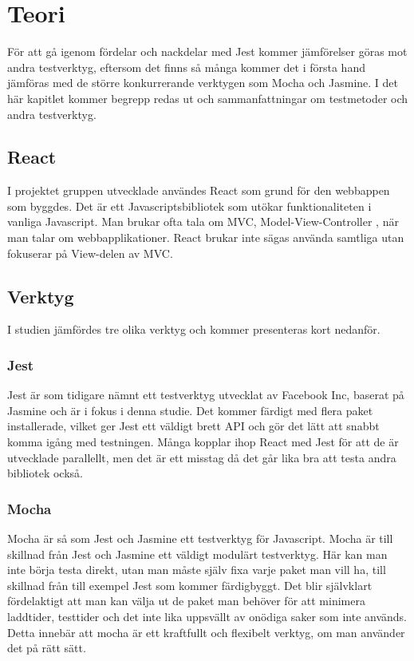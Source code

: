 \section{Teori}
\label{sec:david-theory}
För att gå igenom fördelar och nackdelar med Jest kommer jämförelser göras mot andra testverktyg, eftersom det finns så många kommer det i första hand jämföras med de större konkurrerande verktygen \cite{bib-test-tools} som Mocha och Jasmine. I det här kapitlet kommer begrepp redas ut och sammanfattningar om testmetoder och andra testverktyg.


\subsection{React}
I projektet gruppen utvecklade användes React som grund för den webbappen som byggdes. Det är ett Javascriptsbibliotek som utökar funktionaliteten i vanliga Javascript. Man brukar ofta tala om MVC, Model-View-Controller \cite{bib-mvc}, när man talar om webbapplikationer. React brukar inte sägas använda samtliga utan fokuserar på View-delen av MVC.

\subsection{Verktyg}
I studien jämfördes tre olika verktyg och kommer presenteras kort nedanför.

\subsubsection{Jest}
Jest är som tidigare nämnt ett testverktyg utvecklat av Facebook Inc, baserat på Jasmine och är i fokus i denna studie. Det kommer färdigt med flera paket installerade, vilket ger Jest ett väldigt brett API och gör det lätt att snabbt komma igång med testningen. Många kopplar ihop React med Jest för att de är utvecklade parallellt, men det är ett misstag då det går lika bra att testa andra bibliotek också.

\subsubsection{Mocha}
Mocha är så som Jest och Jasmine ett testverktyg för Javascript. Mocha är till skillnad från Jest och Jasmine ett väldigt modulärt testverktyg. Här kan man inte börja testa direkt, utan man måste själv fixa varje paket man vill ha, till skillnad från till exempel Jest som kommer färdigbyggt. Det blir självklart fördelaktigt att man kan välja ut de paket man behöver för att minimera laddtider, testtider och det inte lika uppsvällt av onödiga saker som inte används. Detta innebär att mocha är ett kraftfullt och flexibelt verktyg, om man använder det på rätt sätt.

